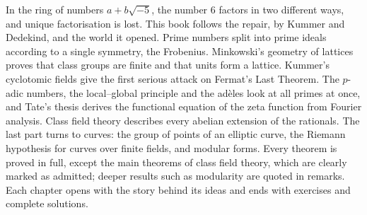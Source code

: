 In the ring of numbers $a+b\sqrt{-5}$, the number $6$ factors in two different ways, and unique factorisation is lost.
This book follows the repair, by Kummer and Dedekind, and the world it opened. Prime numbers split into prime ideals
according to a single symmetry, the Frobenius. Minkowski's geometry of lattices proves that class groups are finite and
that units form a lattice. Kummer's cyclotomic fields give the first serious attack on Fermat's Last Theorem. The $p$-adic
numbers, the local--global principle and the ad\`eles look at all primes at once, and Tate's thesis derives the functional
equation of the zeta function from Fourier analysis. Class field theory describes every abelian extension of the rationals.
The last part turns to curves: the group of points of an elliptic curve, the Riemann hypothesis for curves over finite
fields, and modular forms. Every theorem is proved in full, except the main theorems of class field theory, which are
clearly marked as admitted; deeper results such as modularity are quoted in remarks. Each chapter opens with the story
behind its ideas and ends with exercises and complete solutions.
